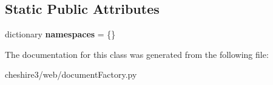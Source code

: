 \subsection*{Static Public Attributes}
\begin{DoxyCompactItemize}
\item 
\hypertarget{classcheshire3_1_1web_1_1document_factory_1_1_srw_document_stream_ac85025c66b663b1d4455fda63e72733e}{dictionary {\bfseries namespaces} = \{\}}\label{classcheshire3_1_1web_1_1document_factory_1_1_srw_document_stream_ac85025c66b663b1d4455fda63e72733e}

\end{DoxyCompactItemize}


The documentation for this class was generated from the following file\-:\begin{DoxyCompactItemize}
\item 
cheshire3/web/document\-Factory.\-py\end{DoxyCompactItemize}
